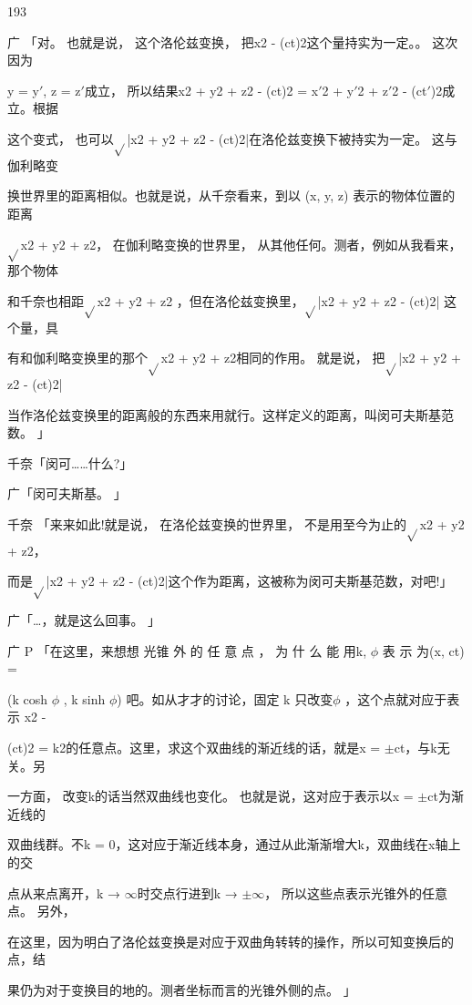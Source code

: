 193\par
广 「对。 也就是说， 这个洛伦兹变换， 把x2 - (ct)2这个量持实为一定。。 这次因为\par
y = y$\prime$, z = z$\prime$成立， 所以结果x2 + y2 + z2 - (ct)2 = x$\prime$2 + y$\prime$2 + z$\prime$2 - (ct$\prime$)2成立。根据\par
这个变式， 也可以$\sqrt{}$|x2 + y2 + z2 - (ct)2|在洛伦兹变换下被持实为一定。 这与伽利略变\par
换世界里的距离相似。也就是说，从千奈看来，到以 (x, y, z) 表示的物体位置的距离\par
$\sqrt{}$x2 + y2 + z2， 在伽利略变换的世界里， 从其他任何。测者，例如从我看来， 那个物体\par
和千奈也相距$\sqrt{}$x2 + y2 + z2 ，但在洛伦兹变换里，$\sqrt{}$|x2 + y2 + z2 - (ct)2| 这个量，具\par
有和伽利略变换里的那个$\sqrt{}$x2 + y2 + z2相同的作用。 就是说， 把$\sqrt{}$|x2 + y2 + z2 - (ct)2|\par
当作洛伦兹变换里的距离般的东西来用就行。这样定义的距离，叫闵可夫斯基范数。 」\par
千奈「闵可……什么?」\par
广「闵可夫斯基。 」\par
千奈 「来来如此!就是说， 在洛伦兹变换的世界里， 不是用至今为止的$\sqrt{}$x2 + y2 + z2，\par
而是$\sqrt{}$|x2 + y2 + z2 - (ct)2|这个作为距离，这被称为闵可夫斯基范数，对吧!」\par
广「…，就是这么回事。 」\par
广 P 「在这里，来想想 光锥 外 的 任 意 点 ， 为 什 么 能 用k, $\phi$ 表 示 为(x, ct) =\par
(k cosh $\phi$ , k sinh $\phi$) 吧。如从才才的讨论，固定 k 只改变$\phi$ ，这个点就对应于表示 x2 -\par
(ct)2 = k2的任意点。这里，求这个双曲线的渐近线的话，就是x = $\pm$ct，与k无关。另\par
一方面， 改变k的话当然双曲线也变化。 也就是说，这对应于表示以x = $\pm$ct为渐近线的\par
双曲线群。不k = 0，这对应于渐近线本身，通过从此渐渐增大k，双曲线在x轴上的交\par
点从来点离开，k → $\infty$时交点行进到k → $\pm$$\infty$， 所以这些点表示光锥外的任意点。 另外，\par
在这里，因为明白了洛伦兹变换是对应于双曲角转转的操作，所以可知变换后的点，结\par
果仍为对于变换目的地的。测者坐标而言的光锥外侧的点。 」\par

